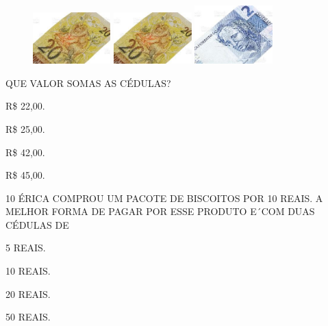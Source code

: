 
\begin{figure}[htpb!]
\centering
\includegraphics[width=1.18253in,height=0.78643in]{media/image108.jpg}
\includegraphics[width=1.18253in,height=0.78643in]{media/image108.jpg}
\includegraphics[width=1.18253in,height=0.88690in]{media/image109.jpg}
\end{figure}

QUE VALOR SOMAS AS CÉDULAS?

\begin{escolha}
\item R\$ 22,00.

\item R\$ 25,00.

\item R\$ 42,00.

\item R\$ 45,00.
\end{escolha}


\num{10} ÉRICA COMPROU UM PACOTE DE BISCOITOS POR 10 REAIS. A MELHOR
FORMA DE PAGAR POR ESSE PRODUTO E´COM DUAS CÉDULAS DE

\begin{escolha}
\item 5 REAIS.

\item 10 REAIS.

\item 20 REAIS.

\item 50 REAIS.
\end{escolha}

